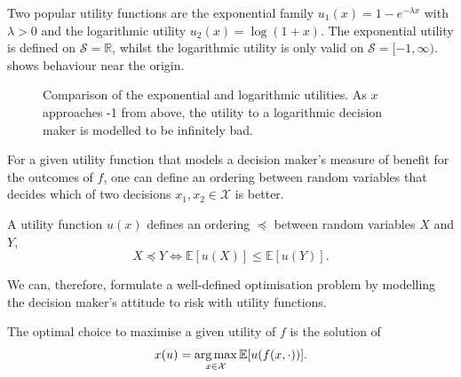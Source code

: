 \documentclass[main.tex]{subfiles}
\begin{document}
\begin{example}
  Two popular utility functions are the exponential family
  $u_1(x)=1-e^{-\lambda x}$ with $\lambda>0$ and the logarithmic
  utility $u_2(x)=\log(1+x)$.
  The exponential utility is defined on $\mathcal{S} =\mathbb{R}$,
  whilst the logarithmic utility is only valid on $\mathcal
  S=[-1,\infty)$.
   shows behaviour near the origin.
  \begin{figure}[htbp]
    \centering
    \caption{Comparison of the exponential and logarithmic
      utilities. As $x$ approaches -1 from above, the utility to a logarithmic
      decision maker is modelled to be infinitely bad.
    }\label{fig:example_utilities}
  \end{figure}
\end{example}

For a given utility function that models a decision maker's measure of
benefit for the outcomes of $f$, one can define an ordering
between random variables that decides which of two decisions
$x_1,x_2\in\mathcal{X}$ is better.
\begin{mydef}
  A utility function $u(x)$ defines an ordering $\preceq$ between random
  variables $X$ and $Y$,
  \begin{equation}
    X\preceq Y \Leftrightarrow \mathbb{E}[u(X)] \leq \mathbb{E}[u(Y)].
  \end{equation}
\end{mydef}

We can, therefore, formulate a well-defined optimisation problem by
modelling the decision maker's attitude to risk with utility functions.

\begin{problem}
  The optimal choice to maximise a given utility of $f$ is the
  solution of
  \begin{align}
    x(u)=\operatorname*{arg\,max}_{x\in\mathcal{X}} \mathbb{E}[u(f(x,\cdot))].
  \end{align}
\end{problem}
\end{document}
